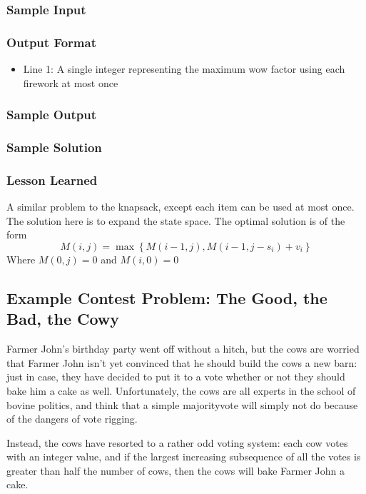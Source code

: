 \subsubsection{Sample Input}


\subsubsection{Output Format}
\begin{itemize}
	\item Line 1: A single integer representing the maximum wow factor using each firework at most once
\end{itemize}
\subsubsection{Sample Output}


\subsubsection{Sample Solution}


\subsubsection{Lesson Learned}
A similar problem to the knapsack, except each item can be used at most once.  The solution here is to expand the state space.  The optimal solution is of the form
$$M(i,j) = \max \left\{ M(i-1, j) , M(i-1, j- s_i) + v_i \right\}$$
Where $M(0,j) = 0$ and $M(i,0) = 0$

\subsection{Example Contest Problem: The Good, the Bad, the Cowy}
Farmer John's birthday party went off without a hitch, but the cows are worried that Farmer John isn't yet convinced that he should build the cows a new barn: just in case, they have decided to put it to a vote whether or not they should bake him a cake as well.
Unfortunately, the cows are all experts in the school of bovine politics, and think that a simple majorityvote will simply not do because of the dangers of vote rigging.

Instead, the cows have resorted to a rather odd voting system: each cow votes with an integer value, and if the largest increasing subsequence of all the votes is greater than half the number of cows, then the cows will bake Farmer John a cake.

